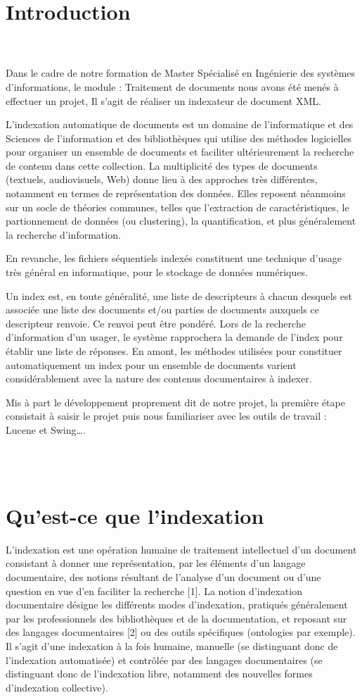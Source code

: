 \documentclass[12pt]{report}
\begin{document}
\section{Introduction}
\begin{frame}
\\
\\
Dans le cadre de notre formation de Master Spécialisé en Ingénierie des systèmes d’informations, le module : Traitement de documents nous avons été menés à effectuer un projet, Il s'agit de réaliser un indexateur de document XML.

L’indexation automatique de documents est un domaine de l'informatique et des Sciences de l'information et des bibliothèques qui utilise des méthodes logicielles pour organiser un ensemble de documents et faciliter ultérieurement la recherche de contenu dans cette collection. La multiplicité des types de documents (textuels, audiovisuels, Web) donne lieu à des approches très différentes, notamment en termes de représentation des données. Elles reposent néanmoins sur un socle de théories communes, telles que l'extraction de caractéristiques, le partionnement de données (ou clustering), la quantification, et plus généralement la recherche d'information.

En revanche, les fichiers séquentiels indexés constituent une technique d'usage très général en informatique, pour le stockage de données numériques.

Un index est, en toute généralité, une liste de descripteurs à chacun desquels est associée une liste des documents et/ou parties de documents auxquels ce descripteur renvoie. Ce renvoi peut être pondéré. Lors de la recherche d'information d'un usager, le système rapprochera la demande de l'index pour établir une liste de réponses. En amont, les méthodes utilisées pour constituer automatiquement un index pour un ensemble de documents varient considérablement avec la nature des contenus documentaires à indexer.

Mis à part le développement proprement dit de notre projet, la première étape consistait à saisir le projet puis nous familiariser avec les outils de travail : Lucene et Swing….
\end{frame}\\
\\
\newpage

\section{Qu'est-ce que l'indexation }
L'indexation est une opération humaine de traitement intellectuel d’un document consistant à donner une représentation, par les éléments d’un langage documentaire, des notions résultant de l’analyse d’un document ou d’une question en vue d’en faciliter la recherche [1].
La notion d’indexation documentaire désigne les différents modes d’indexation, pratiqués généralement par les professionnels des bibliothèques et de la documentation, et reposant sur des langages documentaires [2] ou des outils spécifiques (ontologies par exemple). Il s’agit d’une indexation à la fois humaine, manuelle (se distinguant donc de l’indexation automatisée) et contrôlée par des langages documentaires (se distinguant donc de l’indexation libre, notamment des nouvelles formes d’indexation collective).
\end{document}
